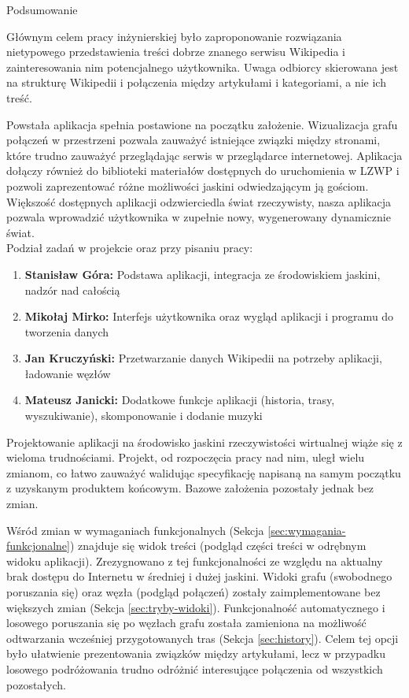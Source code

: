 \begin{chapter}{Podsumowanie}
	\newcommand{\chapterPath}{rozdzialy/7_podsumowanie}
	\label{ch:podsumowanie}
	
	Głównym celem pracy inżynierskiej było zaproponowanie rozwiązania nietypowego przedstawienia treści dobrze znanego serwisu Wikipedia i zainteresowania nim potencjalnego użytkownika. Uwaga odbiorcy skierowana jest na strukturę Wikipedii i połączenia między artykułami i kategoriami, a nie ich treść.

	Powstała aplikacja spełnia postawione na początku założenie. Wizualizacja grafu połączeń w przestrzeni pozwala zauważyć istniejące związki między stronami, które trudno zauważyć przeglądając serwis w przeglądarce internetowej. Aplikacja dołączy również do biblioteki materiałów dostępnych do uruchomienia w LZWP i pozwoli zaprezentować różne możliwości jaskini odwiedzającym ją gościom. Większość dostępnych aplikacji odzwierciedla świat rzeczywisty, nasza aplikacja pozwala wprowadzić użytkownika w zupełnie nowy, wygenerowany dynamicznie świat.\\

	\noindent Podział zadań w projekcie oraz przy pisaniu pracy:
	\begin{enumerate}[label=\textbullet]
		\item \textbf{Stanisław Góra:} \newline Podstawa aplikacji, integracja ze środowiskiem jaskini, nadzór nad całością
		\item \textbf{Mikołaj Mirko:} \newline Interfejs użytkownika oraz wygląd aplikacji i programu do tworzenia danych
		\item \textbf{Jan Kruczyński:} \newline Przetwarzanie danych Wikipedii na potrzeby aplikacji, ładowanie węzłów
		\item \textbf{Mateusz Janicki:} \newline Dodatkowe funkcje aplikacji (historia, trasy, wyszukiwanie), skomponowanie i dodanie muzyki
	\end{enumerate}
	
	Projektowanie aplikacji na środowisko jaskini rzeczywistości wirtualnej wiąże się z wieloma trudnościami. Projekt, od rozpoczęcia pracy nad nim, uległ wielu zmianom, co łatwo zauważyć walidując specyfikację napisaną na samym początku z uzyskanym produktem końcowym. Bazowe założenia pozostały jednak bez zmian.

	Wśród zmian w wymaganiach funkcjonalnych (Sekcja \ref{sec:wymagania-funkcjonalne}) znajduje się widok treści (podgląd części treści w odrębnym widoku aplikacji). Zrezygnowano z tej funkcjonalności ze względu na aktualny brak dostępu do Internetu w średniej i dużej jaskini. Widoki grafu (swobodnego poruszania się) oraz węzła (podgląd połączeń) zostały zaimplementowane bez większych zmian (Sekcja \ref{sec:tryby-widoki}). Funkcjonalność automatycznego i losowego poruszania się po węzłach grafu została zamieniona na możliwość odtwarzania wcześniej przygotowanych tras (Sekcja \ref{sec:history}). Celem tej opcji było ułatwienie prezentowania związków między artykułami, lecz w przypadku losowego podróżowania trudno odróżnić interesujące połączenia od wszystkich pozostałych.


\end{chapter}
